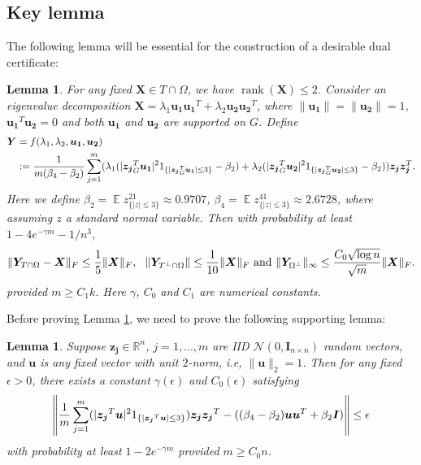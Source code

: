 \documentclass[11pt]{article}
\newtheorem{lemma}[theorem]{Lemma}
\newcommand{\<}{\langle}
\renewcommand{\>}{\rangle}
\newcommand{\E}{\operatorname{\mathbb{E}}}
\newcommand{\vct}[1]{\bm{#1}}
\newcommand{\mtx}[1]{\bm{#1}}
\newcommand{\rank}{\operatorname{rank}}
\numberwithin{equation}{section}
\begin{document}
\subsection{Key lemma}
The following lemma will be essential for the construction of a desirable dual certificate:
\begin{lemma}
\label{key lemma}
For any fixed $\mtx{X} \in T\cap \Omega$, we have $\rank(\mtx{X})\leq 2$. Consider an eigenvalue decomposition $\mtx{X}=
\lambda_1\vct{u_1}\vct{u_1}^T+\lambda_2\vct{u_2}\vct{u_2}^T$, where $\|\vct{u_1}\|=\|\vct{u_2}\|=1$, $
\vct
{u_1}^T\vct{u_2}=0$ and both $\vct{u_1}$ and $\vct{u_2}$ are supported on $G$. Define 
\begin{align*}
\mtx{Y}&=f(\lambda_1, \lambda_2, \vct{u_1}, \vct{u_2})\\
                & :={1\over m(\beta_4-\beta_2)}\sum_{j=1}^m (\lambda_1(|{\vct{z_j}}_G^T\vct{u_1}|^21_{\{|{\vct{z_j}}_G^T\vct
{u_1}|\leq 3\}}-\beta_2)+\lambda_2(|{\vct{z_j}}_G^T\vct{u_2}|^21_{\{|{\vct{z_j}}_G^T\vct{u_2}|\leq 3\}}-
\beta_2))
\vct{z_j}\vct{z_j}^T.
\end{align*}
Here we define $\beta_2=\E z^21_{\{|z|\leq 3\}}\approx 0.9707$, $\beta_4=\E z^41_{\{|z|\leq 3\}}\approx 2.6728$, where 
assuming $z$ a standard normal variable. Then with probability at least $1-4e^{-\gamma m}-1/{n^3}$, 
\[
\|\mtx{Y}_{T\cap \Omega}-\mtx{X}\|_F\leq {1\over 5}\|\mtx{X}\|_F,~~\|\mtx{Y}_{T^\perp\cap \Omega}\|\leq {1\over 
10}\|\mtx{X}\|_F\text{~and~} \|\mtx{Y}_{\Omega^{\perp}}\|_\infty\leq {{C_0\sqrt{\log n}}\over{\sqrt{m}}}
\|
\mtx{X}\|_F.
\]
provided $m\geq C_1k$. Here $\gamma$, $C_0$ and $C_1$ are numerical constants. 
\end{lemma}

Before proving Lemma \ref{key lemma}, we need to prove the following supporting lemma:
\begin{lemma}
\label{supporting}
Suppose $\vct{z_j} \in \mathbb{R}^n$, $j=1,...,m$ are IID $\mathcal{N}(0, \mtx{I}_{n \times n})$ random vectors, and $\vct{u}$ 
is any fixed vector with unit $2$-norm, i.e, $\|\vct{u}\|_2=1$. Then for any fixed $\epsilon>0$, there exists a 
constant 
$\gamma(\epsilon)$ and $C_0(\epsilon)$ satisfying 
\[
\left\|{1\over m}\sum_{j=1}^m (|{\vct{z_j}}^T\vct{u}|^21_{\{|{\vct{z_j}}^T\vct{u}|\leq 3\}}){\vct{z_j}}{\vct{z_j}}^T-((\beta_4-
\beta_2)\vct{u}\vct{u}^T+\beta_2\mtx{I})\right\|\leq \epsilon
\]
with probability at least $1-2e^{-\gamma m}$ provided $m\geq C_0n$.
\end{lemma}
\end{document}
